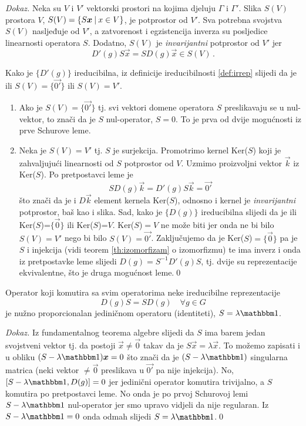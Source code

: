 \emph{Dokaz.}
Neka su $V$ i $V'$ vektorski prostori na kojima djeluju $\Gamma$ i $\Gamma'$.
Slika $S(V)$ prostora $V$, $S(V)=\{S\vec{x} \td x \in V \}$, je potprostor od $V'$. 
Sva potrebna svojstva
$S(V)$ nasljeđuje od $V'$, a zatvorenost i egzistencija inverza su 
posljedice linearnosti operatora $S$.
Dodatno, $S(V)$ je \emph{invarijantni} potprostor od $V'$ jer
$$D'(g)S\vec{x}=SD(g)\vec{x} \in S(V)\,.$$

Kako je $\{D'(g)\}$ ireducibilna, iz
definicije ireducibilnosti \ref{def:irrep} slijedi
da je ili $S(V)=\{\vec{0'}\}$ ili $S(V)=V'$.

\begin{enumerate}
\item Ako je $S(V)=\{\vec{0'}\}$ tj. svi vektori domene operatora $S$
    preslikavaju se u nul-vektor, to znači da je $S$ nul-operator,  $S=0$.
    To je prva od dvije mogućnosti iz prve Schurove leme.

\item Neka je $S(V)=V'$ tj. $S$ je surjekcija. Promotrimo 
    kernel Ker($S$) koji je zahvaljujući linearnosti od $S$
    potprostor od $V$.
    Uzmimo proizvoljni vektor $\vec{k}$ iz Ker($S$).
    Po pretpostavci leme je 
    $$ S D(g) \vec{k} = D'(g)S\vec{k} = \vec{0'}$$
    što znači da je i $D\vec{k}$ element kernela Ker($S$), odnosno
    i kernel je \emph{invarijantni} potprostor, baš kao i slika.
    Sad, kako je $\{D(g)\}$ ireducibilna slijedi da je ili
    Ker($S$)=$\{\vec{0}\}$ ili Ker($S$)=$V$.
    Ker($S$)$=V$ ne može biti jer onda ne bi bilo $S(V)=V'$ nego bi bilo
      $S(V)=\vec{0'}$.
    Zaključujemo da je Ker($S$)$=\{\vec{0}\}$ pa je $S$ i injekcija (vidi
    teorem \ref{th:izomorfizam} o izomorfizmu) te ima inverz
    i onda iz pretpostavke leme slijedi $D(g)=S^{-1}D'(g)S$, tj.
    dvije su reprezentacije ekvivalentne, što je druga mogućnost leme.\qed 
\end{enumerate}

\begin{teorem}
Operator koji komutira sa svim operatorima neke ireducibilne 
reprezentacije
\begin{displaymath}
  D(g)S=SD(g) \quad \forall g\in G
\end{displaymath}
je nužno proporcionalan jediničnom operatoru
(identiteti), $S = \lambda \Eins$.
\end{teorem}

\emph{Dokaz.} Iz fundamentalnog teorema algebre slijedi da $S$ ima
barem jedan svojstveni vektor tj. da postoji
$\vec{x}\neq\vec{0}$ takav da je $S\vec{x}=\lambda\vec{x}$.
To možemo zapisati i u obliku $(S-\lambda\Eins)\vec{x}=0$ što
znači da je $(S-\lambda\Eins)$
singularna matrica (neki vektor $\neq \vec{0}$ preslikava u
$\vec{0'}$ pa nije injekcija).
No, $[S-\lambda\Eins, D(g)]=0$
jer jedinični operator komutira trivijalno, a $S$ komutira po pretpostavci leme.
No onda je po prvoj Schurovoj lemi $S-\lambda\Eins$ nul-operator jer smo upravo vidjeli
da nije regularan. Iz $S-\lambda\Eins=0$ onda odmah slijedi $S=\lambda\Eins$.\qed




